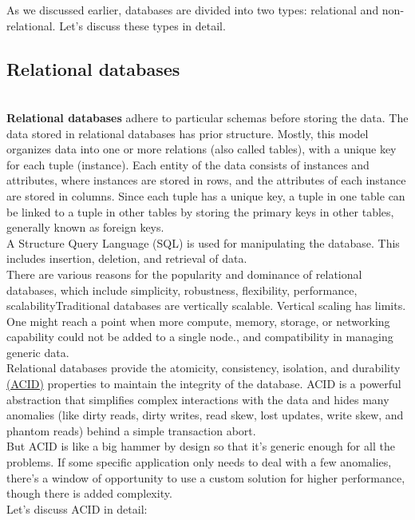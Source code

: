 

As we discussed earlier, databases are divided into two types: relational and non-relational. Let's discuss these types in detail.

\subsection{Relational databases}\label{zHzAP2aI98UMAcpQtYgL7}
\\
\textbf{Relational databases} adhere to particular schemas before storing the data. The data stored in relational databases has prior structure. Mostly, this model organizes data into one or more relations (also called tables), with a unique key for each tuple (instance). Each entity of the data consists of instances and attributes, where instances are stored in rows, and the attributes of each instance are stored in columns. Since each tuple has a unique key, a tuple in one table can be linked to a tuple in other tables by storing the primary keys in other tables, generally known as foreign keys.
\\
A Structure Query Language (SQL) is used for manipulating the database. This includes insertion, deletion, and retrieval of data.
\\
There are various reasons for the popularity and dominance of relational databases, which include simplicity, robustness, flexibility, performance, scalabilityTraditional databases are vertically scalable. Vertical scaling has limits. One might reach a point when more compute, memory, storage, or networking capability could not be added to a single node., and compatibility in managing generic data.
\\
Relational databases provide the atomicity, consistency, isolation, and durability \href{https://www.educative.io/answers/what-are-acid-properties-in-a-database}{(ACID)} properties to maintain the integrity of the database. ACID is a powerful abstraction that simplifies complex interactions with the data and hides many anomalies (like dirty reads, dirty writes, read skew, lost updates, write skew, and phantom reads) behind a simple transaction abort.
\\
But ACID is like a big hammer by design so that it's generic enough for all the problems. If some specific application only needs to deal with a few anomalies, there's a window of opportunity to use a custom solution for higher performance, though there is added complexity.
\\
Let's discuss ACID in detail:

